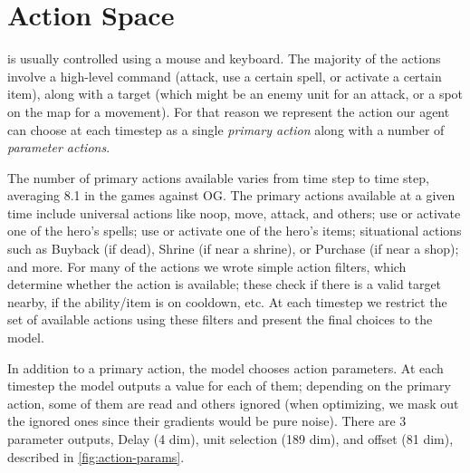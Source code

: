 \documentclass[ocean-paper.tex]{subfiles}
\begin{document}
\section{Action Space}\label{appendix:actionspace}

\dota is usually controlled using a mouse and keyboard. The majority of the actions involve a high-level command (attack, use a certain spell, or activate a certain item), along with a target (which might be an enemy unit for an attack, or a spot on the map for a movement). For that reason we represent the action our agent can choose at each timestep as a single {\it primary action} along with a number of {\it parameter actions}. 

The number of primary actions available varies from time step to time step, averaging 8.1 in the games against OG. The primary actions available at a given time include universal actions like noop, move, attack, and others; use or activate one of the hero's spells; use or activate one of the hero's items; situational actions such as Buyback (if dead), Shrine (if near a shrine), or Purchase (if near a shop); and more.
For many of the actions we wrote simple action filters, which determine whether the action is available; these check if there is a valid target nearby, if the ability/item is on cooldown, etc. At each timestep we restrict the set of available actions using these filters and present the final choices to the model.

In addition to a primary action, the model chooses action parameters. At each timestep the model outputs a value for each of them; depending on the primary action, some of them are read and others ignored (when optimizing, we mask out the ignored ones since their gradients would be pure noise). There are 3 parameter outputs, Delay (4 dim), unit selection (189 dim), and offset (81 dim), described in \autoref{fig:action-params}.
\end{document}
